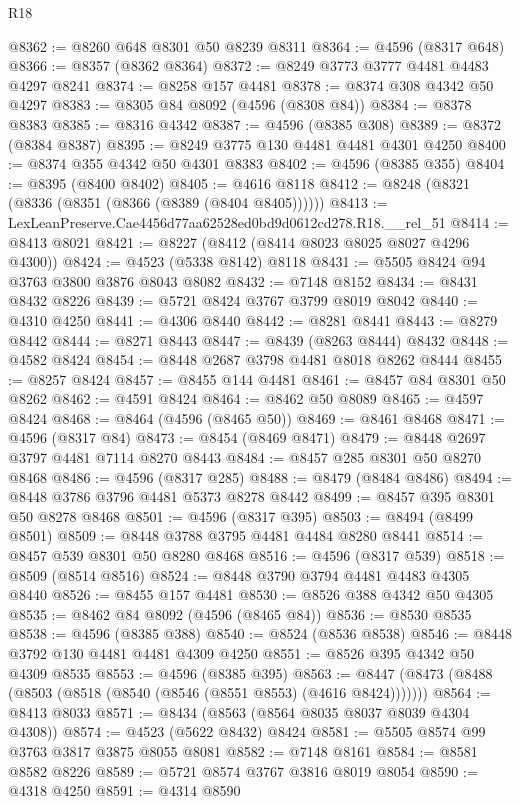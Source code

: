 \begin{lexlean}{R18}
\begin{coremodule}
@8362 := @8260 @648 @8301 @50 @8239 @8311
@8364 := @4596 (@8317 @648)
@8366 := @8357 (@8362 @8364)
@8372 := @8249 @3773 @3777 @4481 @4483 @4297 @8241
@8374 := @8258 @157 @4481
@8378 := @8374 @308 @4342 @50 @4297
@8383 := @8305 @84 @8092 (@4596 (@8308 @84))
@8384 := @8378 @8383
@8385 := @8316 @4342
@8387 := @4596 (@8385 @308)
@8389 := @8372 (@8384 @8387)
@8395 := @8249 @3775 @130 @4481 @4481 @4301 @4250
@8400 := @8374 @355 @4342 @50 @4301 @8383
@8402 := @4596 (@8385 @355)
@8404 := @8395 (@8400 @8402)
@8405 := @4616 @8118
@8412 := @8248 (@8321 (@8336 (@8351 (@8366 (@8389 (@8404 @8405))))))
@8413 := LexLeanPreserve.Cae4456d77aa62528ed0bd9d0612cd278.R18.__rel_51
@8414 := @8413 @8021
@8421 := @8227 (@8412 (@8414 @8023 @8025 @8027 @4296 @4300))
@8424 := @4523 (@5338 @8142) @8118
@8431 := @5505 @8424 @94 @3763 @3800 @3876 @8043 @8082
@8432 := @7148 @8152
@8434 := @8431 @8432 @8226
@8439 := @5721 @8424 @3767 @3799 @8019 @8042
@8440 := @4310 @4250
@8441 := @4306 @8440
@8442 := @8281 @8441
@8443 := @8279 @8442
@8444 := @8271 @8443
@8447 := @8439 (@8263 @8444) @8432
@8448 := @4582 @8424
@8454 := @8448 @2687 @3798 @4481 @8018 @8262 @8444
@8455 := @8257 @8424
@8457 := @8455 @144 @4481
@8461 := @8457 @84 @8301 @50 @8262
@8462 := @4591 @8424
@8464 := @8462 @50 @8089
@8465 := @4597 @8424
@8468 := @8464 (@4596 (@8465 @50))
@8469 := @8461 @8468
@8471 := @4596 (@8317 @84)
@8473 := @8454 (@8469 @8471)
@8479 := @8448 @2697 @3797 @4481 @7114 @8270 @8443
@8484 := @8457 @285 @8301 @50 @8270 @8468
@8486 := @4596 (@8317 @285)
@8488 := @8479 (@8484 @8486)
@8494 := @8448 @3786 @3796 @4481 @5373 @8278 @8442
@8499 := @8457 @395 @8301 @50 @8278 @8468
@8501 := @4596 (@8317 @395)
@8503 := @8494 (@8499 @8501)
@8509 := @8448 @3788 @3795 @4481 @4484 @8280 @8441
@8514 := @8457 @539 @8301 @50 @8280 @8468
@8516 := @4596 (@8317 @539)
@8518 := @8509 (@8514 @8516)
@8524 := @8448 @3790 @3794 @4481 @4483 @4305 @8440
@8526 := @8455 @157 @4481
@8530 := @8526 @388 @4342 @50 @4305
@8535 := @8462 @84 @8092 (@4596 (@8465 @84))
@8536 := @8530 @8535
@8538 := @4596 (@8385 @388)
@8540 := @8524 (@8536 @8538)
@8546 := @8448 @3792 @130 @4481 @4481 @4309 @4250
@8551 := @8526 @395 @4342 @50 @4309 @8535
@8553 := @4596 (@8385 @395)
@8563 := @8447 (@8473 (@8488 (@8503 (@8518 (@8540 (@8546 (@8551 @8553) (@4616 @8424)))))))
@8564 := @8413 @8033
@8571 := @8434 (@8563 (@8564 @8035 @8037 @8039 @4304 @4308))
@8574 := @4523 (@5622 @8432) @8424
@8581 := @5505 @8574 @99 @3763 @3817 @3875 @8055 @8081
@8582 := @7148 @8161
@8584 := @8581 @8582 @8226
@8589 := @5721 @8574 @3767 @3816 @8019 @8054
@8590 := @4318 @4250
@8591 := @4314 @8590

\end{coremodule}
\end{lexlean}
